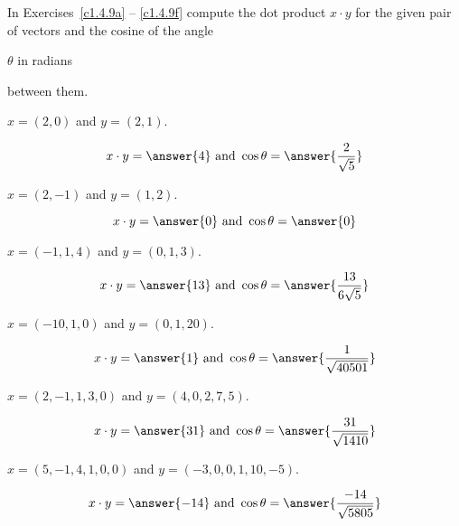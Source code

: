 \documentclass{ximera}
\begin{document}
\noindent In Exercises~\ref{c1.4.9a} -- \ref{c1.4.9f}
compute the dot product $x\cdot y$ for the given pair of vectors and 
the cosine of the angle \begin{prompt}$\theta$ in radians\end{prompt} between them.
\begin{exercise} \label{c1.4.9a}
  $x=(2,0)$ and $y=(2,1)$.
  \begin{prompt}
    \[x \cdot y = \answer{4} \mbox{ and }
    \cos \theta = \answer{\frac{2}{\sqrt{5}}}\]
  \end{prompt}
\end{exercise}
\begin{exercise} \label{c1.4.9b}
  $x=(2,-1)$ and $y=(1,2)$.
    \begin{prompt}
    \[x \cdot y = \answer{0} \mbox{ and }
    \cos \theta = \answer{0}\]
  \end{prompt}
\end{exercise}
\begin{exercise} \label{c1.4.9c}
  $x=(-1,1,4)$ and $y=(0,1,3)$.
  \begin{prompt}
    \[x \cdot y = \answer{13} \mbox{ and }
    \cos \theta = \answer{\frac{13}{6\sqrt{5}}}\]
  \end{prompt}
\end{exercise}
\begin{exercise} \label{c1.4.9d}
  $x=(-10,1,0)$ and $y=(0,1,20)$.
    \begin{prompt}
    \[x \cdot y = \answer{1} \mbox{ and }
    \cos \theta = \answer{\frac{1}{\sqrt{40501}}}\]
  \end{prompt}
\end{exercise}
\begin{exercise} \label{c1.4.9e}
  $x=(2,-1,1,3,0)$ and $y=(4,0,2,7,5)$.
      \begin{prompt}
    \[x \cdot y = \answer{31} \mbox{ and }
    \cos \theta = \answer{\frac{31}{\sqrt{1410}}}\]
  \end{prompt}
\end{exercise}
\begin{exercise} \label{c1.4.9f}
  $x=(5,-1,4,1,0,0)$ and $y=(-3,0,0,1,10,-5)$.
      \begin{prompt}
    \[x \cdot y = \answer{-14} \mbox{ and }
    \cos \theta = \answer{\frac{-14}{\sqrt{5805}}}\]
  \end{prompt}
  
\end{exercise}
\end{document}
